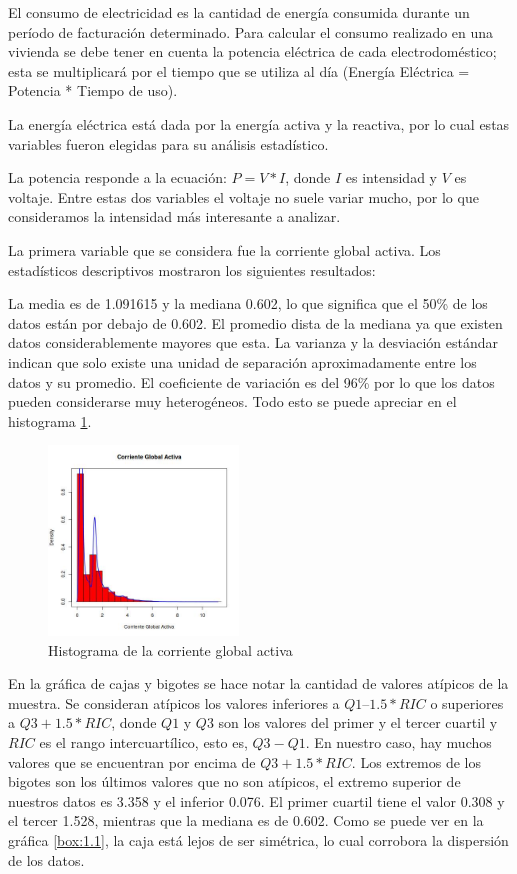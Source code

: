 \documentclass[a4paper,10pt,twocolumn]{report}
\begin{document}
	El consumo de electricidad es la cantidad de energía consumida durante un período de facturación determinado. Para calcular el consumo realizado en una vivienda se debe tener en cuenta la potencia eléctrica de cada electrodoméstico; esta se multiplicará por el tiempo que se utiliza al día (Energía Eléctrica = Potencia * Tiempo de uso). 
	
	La energía eléctrica está dada por la energía activa y la reactiva, por lo cual estas variables fueron elegidas para su análisis estadístico. 
	
	La potencia responde a la ecuación: $P = V * I$, donde $I$ es intensidad y $V$ es voltaje. Entre estas dos variables el voltaje no suele variar mucho, por lo que consideramos la intensidad más interesante a analizar.
	
	La primera variable que se considera fue la corriente global activa. Los estadísticos descriptivos mostraron los siguientes resultados:
	
	La media es de 1.091615 y la mediana 0.602, lo que significa que el 50\% de los datos están por debajo de 0.602. El promedio dista de la mediana ya que existen datos considerablemente mayores que esta. La varianza y la desviación estándar indican que solo existe una unidad de separación aproximadamente entre los datos y su promedio. El coeficiente de variación es del 96\% por lo que los datos pueden considerarse muy heterogéneos. Todo esto se puede apreciar en el histograma \ref{hist:1.1}.
	
	\begin{figure}[H]
		\centering
		\includegraphics[width=0.45\textwidth]{img/ex1/Histograms/Histograms_GAP.jpeg} 
		\caption{Histograma de la corriente global activa}
		\label{hist:1.1}
	\end{figure}
	
	En la gráfica de cajas y bigotes se hace notar la cantidad de valores atípicos de la muestra. Se consideran atípicos los valores inferiores a $Q1–1.5*RIC$ o superiores a $Q3+1.5*RIC$, donde $Q1$ y $Q3$ son los valores del primer y el tercer cuartil y $RIC$ es el rango intercuartílico, esto es, $Q3-Q1$. En nuestro caso, hay muchos valores que se encuentran por encima de $Q3+1.5*RIC$. Los extremos de los bigotes son los últimos valores que no son atípicos, el extremo superior de nuestros datos es 3.358 y el inferior 0.076. El primer cuartil tiene el valor 0.308 y el tercer 1.528, mientras que la mediana es de 0.602. Como se puede ver en la gráfica \ref{box:1.1}, la caja está lejos de ser simétrica, lo cual corrobora la dispersión de los datos.
	
\end{document}
